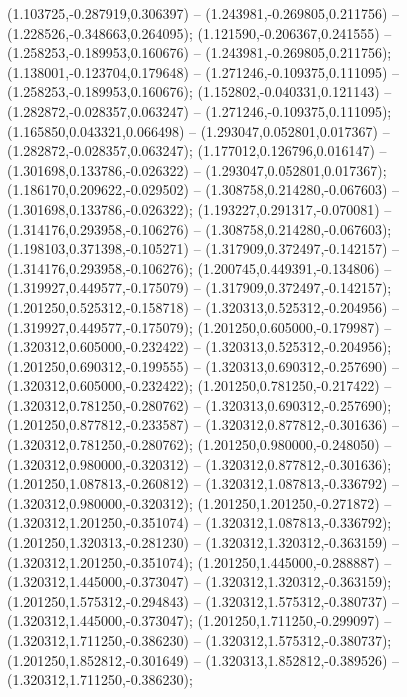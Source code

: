  (1.103725,-0.287919,0.306397) -- (1.243981,-0.269805,0.211756) -- (1.228526,-0.348663,0.264095);
 (1.121590,-0.206367,0.241555) -- (1.258253,-0.189953,0.160676) -- (1.243981,-0.269805,0.211756);
 (1.138001,-0.123704,0.179648) -- (1.271246,-0.109375,0.111095) -- (1.258253,-0.189953,0.160676);
 (1.152802,-0.040331,0.121143) -- (1.282872,-0.028357,0.063247) -- (1.271246,-0.109375,0.111095);
 (1.165850,0.043321,0.066498) -- (1.293047,0.052801,0.017367) -- (1.282872,-0.028357,0.063247);
 (1.177012,0.126796,0.016147) -- (1.301698,0.133786,-0.026322) -- (1.293047,0.052801,0.017367);
 (1.186170,0.209622,-0.029502) -- (1.308758,0.214280,-0.067603) -- (1.301698,0.133786,-0.026322);
 (1.193227,0.291317,-0.070081) -- (1.314176,0.293958,-0.106276) -- (1.308758,0.214280,-0.067603);
 (1.198103,0.371398,-0.105271) -- (1.317909,0.372497,-0.142157) -- (1.314176,0.293958,-0.106276);
 (1.200745,0.449391,-0.134806) -- (1.319927,0.449577,-0.175079) -- (1.317909,0.372497,-0.142157);
 (1.201250,0.525312,-0.158718) -- (1.320313,0.525312,-0.204956) -- (1.319927,0.449577,-0.175079);
 (1.201250,0.605000,-0.179987) -- (1.320312,0.605000,-0.232422) -- (1.320313,0.525312,-0.204956);
 (1.201250,0.690312,-0.199555) -- (1.320313,0.690312,-0.257690) -- (1.320312,0.605000,-0.232422);
 (1.201250,0.781250,-0.217422) -- (1.320312,0.781250,-0.280762) -- (1.320313,0.690312,-0.257690);
 (1.201250,0.877812,-0.233587) -- (1.320312,0.877812,-0.301636) -- (1.320312,0.781250,-0.280762);
 (1.201250,0.980000,-0.248050) -- (1.320312,0.980000,-0.320312) -- (1.320312,0.877812,-0.301636);
 (1.201250,1.087813,-0.260812) -- (1.320312,1.087813,-0.336792) -- (1.320312,0.980000,-0.320312);
 (1.201250,1.201250,-0.271872) -- (1.320312,1.201250,-0.351074) -- (1.320312,1.087813,-0.336792);
 (1.201250,1.320313,-0.281230) -- (1.320312,1.320312,-0.363159) -- (1.320312,1.201250,-0.351074);
 (1.201250,1.445000,-0.288887) -- (1.320312,1.445000,-0.373047) -- (1.320312,1.320312,-0.363159);
 (1.201250,1.575312,-0.294843) -- (1.320312,1.575312,-0.380737) -- (1.320312,1.445000,-0.373047);
 (1.201250,1.711250,-0.299097) -- (1.320312,1.711250,-0.386230) -- (1.320312,1.575312,-0.380737);
 (1.201250,1.852812,-0.301649) -- (1.320313,1.852812,-0.389526) -- (1.320312,1.711250,-0.386230);
